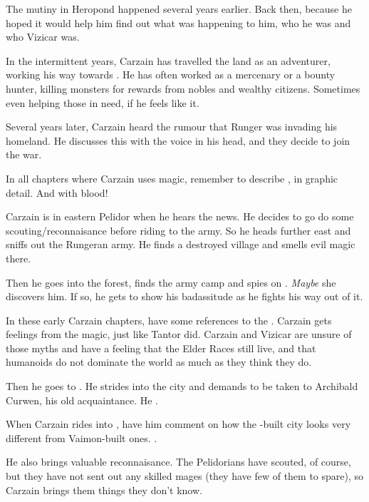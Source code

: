 \begin{garbage}
\begin{changes}
    The mutiny in Heropond happened several years earlier. 
    Back then,  because he hoped it would help him find out what was happening to him, who he was and who Vizicar was. 
    
    In the intermittent years, Carzain has travelled the land as an adventurer, working his way towards \kenosis. 
    He has often worked as a mercenary or a bounty hunter, killing monsters for rewards from nobles and wealthy citizens. 
    Sometimes even helping those in need, if he feels like it. 
    
    Several years later, Carzain heard the rumour that Runger was invading his homeland. 
    He discusses this with the voice in his head, and they decide to join the war. 
    
    In all chapters where Carzain uses magic, remember to describe , in graphic detail. 
    And with blood! 
    
    Carzain is in eastern Pelidor when he hears the news. 
    He decides to go do some scouting/reconnaisance before riding to the army. 
    So he heads further east and sniffs out the Rungeran army. 
    He finds a destroyed village and smells evil magic there. 
    
    Then he goes into the forest, finds the army camp and spies on \Takestsha. 
    \emph{Maybe} she discovers him. 
    If so, he gets to show his badassitude as he fights his way out of it. 
    
    In these early Carzain chapters, have some references to the . 
    Carzain gets  feelings from the \EreshKali{} magic, just like Tantor did. 
    Carzain and Vizicar are unsure of those myths and have a feeling that the Elder Races still live, and that humanoids do not dominate the world as much as they think they do. 
    
    Then he goes to \Forklin. 
    He strides into the city and demands to be taken to Archibald Curwen, his old acquaintance. 
    He . 
    
    When Carzain rides into \Forklin, have him comment on how the \Ortaican-built city looks very different from Vaimon-built ones. 
    . 
    
    He also brings valuable reconnaisance. 
    The Pelidorians have scouted, of course, but they have not sent out any skilled mages (they have few of them to spare), so Carzain brings them things they don't know. 
    

\end{changes}
\end{garbage}
